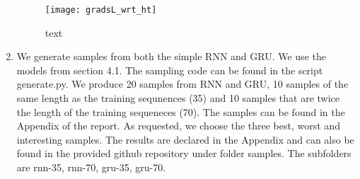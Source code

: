 \begin{enumerate}
\begin{figure}
	\centering
	\texttt{[image: gradsL\_wrt\_ht]}
	\caption{text}
	\label{fig:5_2}
\end{figure}
\item
We generate samples from both the simple RNN and GRU. We use the models from section 4.1. The sampling code can be found in the script generate.py. We produce 20 samples from RNN and GRU, 10 samples of the same length as the training sequnences (35) and 10 samples that are twice the length of the training sequeneces (70). The samples can be found in the Appendix of the report. As requested, we choose the three best, worst and interesting samples. The results are declared in the Appendix and can also be found in the provided github repository under folder samples. The subfolders are rnn-35, rnn-70, gru-35, gru-70. 

 
\end{enumerate}